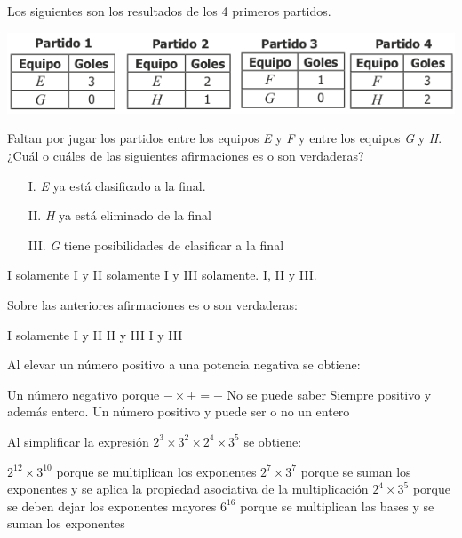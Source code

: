 \documentclass[10pt,letterpaper,addpoints]{exam}
\begin{document}
\begin{questions}
\begin{multicols}{2}
{Los siguientes son los resultados de los 4 primeros partidos.
\begin{center}
\includegraphics[scale=.4]{Images/partidos.png}
\end{center}}
\question Faltan por jugar los partidos entre los equipos \textit{E} y \textit{F} y entre los equipos \textit{G} y \textit{H}. ¿Cuál o cuáles de las siguientes afirmaciones es o son verdaderas?
\begin{itemize}
  \item[I.] \textit{E} ya está clasificado a la final.
  \item[II.] \textit{H} ya está eliminado de la final
  \item[III.] \textit{G} tiene posibilidades de clasificar a la final 
\end{itemize}
\begin{choices}
    \choice I solamente
    \CorrectChoice I y II solamente
    \choice I y III solamente.
    \choice I, II y III.
\end{choices}
\question Sobre las anteriores afirmaciones es o son verdaderas:
\begin{choices}
    \choice I solamente
    \choice I y II
    \CorrectChoice II y III
    \choice I y III
\end{choices}
\question Al elevar un número positivo a una potencia negativa se obtiene:
\begin{choices}
    \choice Un número negativo porque $ -\times+=- $
    \choice No se puede saber
    \choice Siempre positivo y además entero.
    \CorrectChoice Un número positivo y puede ser o no un entero 
\end{choices}
  \question Al simplificar la expresión $ 2^3\times3^2\times2^4\times3^5 $ se obtiene:
\begin{choices}
    \choice $ 2^{12}\times3^{10} $ porque se multiplican los exponentes
    \CorrectChoice $ 2^7\times3^7 $ porque se suman los exponentes y se aplica la propiedad asociativa de la multiplicación
    \choice $ 2^4\times3^5 $ porque se deben dejar los exponentes mayores
    \choice $ 6^{16} $ porque se multiplican las bases y se suman los exponentes
\end{choices}
\end{multicols}
\end{questions}
\end{document}
